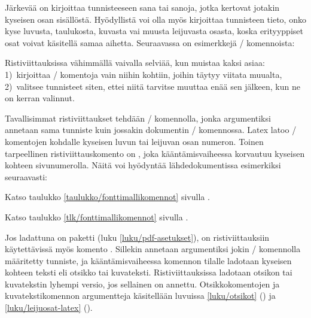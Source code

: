 Järkevää on kirjoittaa tunnisteeseen sana tai sanoja, jotka kertovat
jotakin kyseisen osan sisällöstä. Hyödyllistä voi olla myös kirjoittaa
tunnisteen tieto, onko kyse luvusta, taulukosta, kuvasta vai muusta
leijuvasta osasta, koska erityyppiset osat voivat käsitellä samaa
aihetta. Seuraavassa on esimerkkejä \-/ komennoista:

\begin{koodilohkosis}
\label{luku/fonttien-valinta}    %
\label{taulukko/fonttikomentoja} %
\label{kuva/kirjainleikkauksia}  %
\end{koodilohkosis}

\noindent
Ristiviittauksissa vähimmällä vaivalla selviää, kun muistaa kaksi asiaa:
1)~kirjoittaa \-/ komentoja vain niihin kohtiin, joihin
täytyy viitata muualta, 2)~valitsee tunnisteet siten, ettei niitä
tarvitse muuttaa enää sen jälkeen, kun ne on kerran valinnut.

Tavallisimmat ristiviittaukset tehdään \-/ komennolla,
jonka argumentiksi annetaan sama tunniste kuin jossakin dokumentin
\-/ komennossa. Latex latoo \-/ komentojen
kohdalle kyseisen luvun tai leijuvan osan numeron. Toinen tarpeellinen
ristiviittauskomento on , joka kääntämisvaiheessa
korvautuu kyseisen kohteen sivunumerolla. Näitä voi hyödyntää
lähdedokumentissa esimerkiksi seuraavasti:

\begin{koodilohkosis}
Katso taulukko \ref{taulukko/fonttimallikomennot} sivulla
\pageref{taulukko/fonttimallikomennot}.
\end{koodilohkosis}

\begin{tulossis}
  Katso taulukko \ref{tlk/fonttimallikomennot} sivulla
  \pageref{tlk/fonttimallikomennot}.
\end{tulossis}

\noindent
Jos ladattuna on paketti  (luku
\ref{luku/pdf-asetukset}), on ristiviittauksiin käytettävissä myös
komento . Sillekin annetaan argumentiksi jokin
\-/ komennolla määritetty tunniste, ja kääntämisvaiheessa
komennon tilalle ladotaan kyseisen kohteen teksti eli otsikko tai
kuvateksti. Ristiviittauksissa ladotaan otsikon tai kuvatekstin lyhempi
versio, jos sellainen on annettu. Otsikkokomentojen ja
kuvatekstikomennon argumentteja käsitellään luvuissa \ref{luku/otsikot}
() ja \ref{luku/leijuosat-latex}
().

